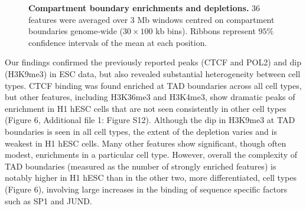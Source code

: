 \documentclass[a4paper,10pt,oneside]{book}
\begin{document}
\begin{figure}
\begin{center} 
\captionsetup{width=1.2\textwidth}
\caption{ {\bf Compartment boundary enrichments and depletions.}
36 features were averaged over 3 Mb windows centred on compartment boundaries genome-wide ($30 \times 100$ kb bins). Ribbons represent $95\%$ confidence intervals of the mean at each position.
}\label{fig:allcompartments}
\end{center}
\end{figure} 

Our findings confirmed the previously reported peaks (CTCF and POL2) and dip (H3K9me3) in ESC data, but also revealed substantial heterogeneity between cell types. CTCF binding was found enriched at TAD boundaries across all cell types, but other features, including H3K36me3 and H3K4me3, show dramatic peaks of enrichment in H1 hESC cells that are not seen consistently in other cell types (Figure 6, Additional file 1: Figure S12). Although the dip in H3K9me3 at TAD boundaries is seen in all cell types, the extent of the depletion varies and is weakest in H1 hESC cells. Many other features show significant, though often modest, enrichments in a particular cell type. However, overall the complexity of TAD boundaries (measured as the number of strongly enriched features) is notably higher in H1 hESC than in the other two, more differentiated, cell types (Figure 6), involving large increases in the binding of sequence specific factors such as SP1 and JUND.
\end{document}
